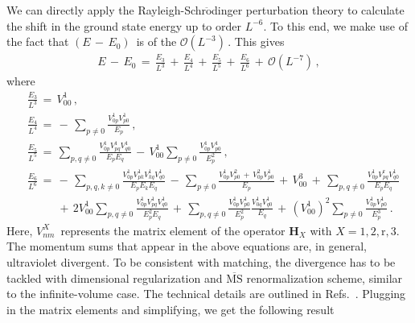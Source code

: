 \documentclass[12pt,prd,tightenlines,nofootinbib]{revtex4-2}
\begin{document}
We can directly apply the Rayleigh-Schr$\ddot{\text{o}}$dinger perturbation theory to calculate the shift in the ground state energy up to order $L^{-6}$.
To this end, we make use of the fact that $(E\, -\, E_{0})\,$ is of the $\mathcal{O}(L^{-3})\,$. This gives
\begin{align}
    E\, -\, E_{0}\, =\, \frac{E_{3}}{L^{3}}\, +\, \frac{E_{4}}{L^{4}}\, +\, \frac{E_{5}}{L^{5}}\,+\,\frac{E_{6}}{L^{6}}\,+\, \mathcal{O}(L^{-7})\,,
\end{align}
where
\begin{align}
    &\frac{E_{3}}{L^{3}}\, = \, V^{1}_{00}\,,\\[2mm]
    &\frac{E_{4}}{L^{4}}\, = \, -\,\sum_{p \neq 0}\frac{V^{1}_{0p}V^{1}_{p0}}{E_{p}}\,,\label{eq:e4}\\[2mm]
    &\frac{E_{5}}{L^{5}}\, = \, \sum_{p,q\neq 0}\frac{V^{1}_{0p}V^{1}_{pq}V^{1}_{q0}}{E_{p}E_{q}}\,-\,  V^{1}_{00}\sum_{p\neq 0}\frac{V^{1}_{0p}V^{1}_{p0}}{E_{p}^{2}}\,,\\[2mm]
    &\frac{E_{6}}{L^{6}}\, = \, -\,\sum_{p,q,k \neq 0} \frac{V^{1}_{0p}V^{1}_{pk}V^{1}_{kq}V^{1}_{q0}}{E_{p}E_{k}E_{q}}\, -\, \sum_{p \neq 0} \frac{V^{1}_{0p}V^{2}_{p0}\,+\, V^{2}_{0p}V^{1}_{p0}}{E_{p}}\, +\, V^{3}_{00}\, +\, \sum_{p,q \neq 0} \frac{V^{1}_{0p}V^{\text{r}}_{pq}V^{1}_{q0}}{E_{p}E_{q}}\nonumber\\[2mm]
    &\hspace{30pt}\, +\, 2V^{1}_{00}\sum_{p,q\neq 0}\frac{V^{1}_{0p}V^{1}_{pq}V^{1}_{q0}}{E^{2}_{p}E_{q}}\,+\, \sum_{p,q\neq 0}\frac{V^{1}_{0p}V^{1}_{p0}}{E^{2}_{p}}\frac{V^{1}_{0q}V^{1}_{q0}}{E_{q}}\, +\, (V^{1}_{00})^{2}\sum_{p \neq 0}\frac{V^{1}_{0p}V^{1}_{p0}}{E^{3}_{p}}\,.
\end{align}
Here, $V^X_{nm}\,$ represents the matrix element of the operator $\textbf{H}_X$ with
$X=1,2,\text{r},3$. The momentum sums that appear in the above equations are,
in general, ultraviolet divergent. To be consistent with matching,
the divergence has to be tackled with dimensional regularization and
$\overline{\text{MS}}$ renormalization scheme, similar to the infinite-volume case.
The technical details are outlined in Refs.~\cite{Romero-Lopez:2020rdq,Beane:2007qr}.
Plugging in the matrix elements and simplifying, we get the following result
\end{document}
